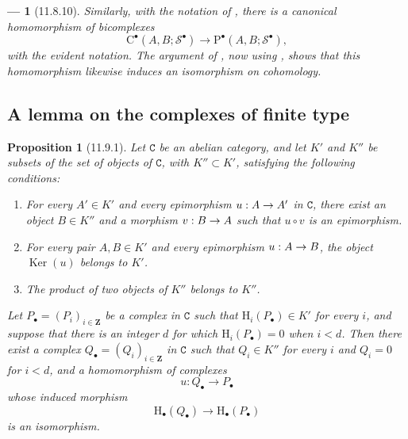 \documentclass[oneside]{amsart}
\theoremstyle{ega-env-style}
\newtheorem*{env}{---}
\theoremstyle{ega-thm-env-style}
\newtheorem*{proposition}{Proposition}
\theoremstyle{ega-defn-env-style}
\def\mathcal{\mathscr}
\def\sh{\mathcal}                   %
\def\bb{\mathbf}                    %
\def\cat{\mathtt}                   %
\def\HH{\mathrm{H}}                 %
\def\Ker{\operatorname{Ker}}
\renewcommand{\to}{\mathchoice{\longrightarrow}{\rightarrow}{\rightarrow}{\rightarrow}}
\let\EGAOriginalLabel\label
\renewcommand{\label}[1]{\phantomsection\EGAOriginalLabel{#1}}
\begin{document}
\begin{env}[11.8.10]
\label{0.11.8.10}
Similarly, with the notation of , there is a canonical
homomorphism of bicomplexes
\[
  \mathrm{C}^\bullet(A,B;\sh{S}^\bullet)
  \longrightarrow
  \mathrm{P}^\bullet(A,B;\sh{S}^\bullet),
\]
with the evident notation.
The argument of , now using , shows that
this homomorphism likewise induces an isomorphism on cohomology.
\end{env}

\subsection{A lemma on the complexes of finite type}
\label{subsection:0.11.9}

\begin{proposition}[11.9.1]
\label{0.11.9.1}
Let $\cat{C}$ be an abelian category, and let $K'$ and $K''$ be subsets
of the set of objects of $\cat{C}$, with $K''\subset K'$, satisfying the
following conditions:
\begin{enumerate}
  \item[{\rm(i)}]
  \emph{For every $A'\in K'$ and every epimorphism $u:A\to A'$ in
  $\cat{C}$, there exist an object $B\in K''$ and a morphism $v:B\to A$
  such that $u\circ v$ is an epimorphism.}

  \item[{\rm(ii)}]
  \emph{For every pair $A,B\in K'$ and every epimorphism $u:A\to B$,
  the object $\Ker(u)$ belongs to $K'$.}

  \item[{\rm(iii)}]
  \emph{The product of two objects of $K''$ belongs to $K''$.}
\end{enumerate}

\emph{Let $P_\bullet=(P_i)_{i\in\bb{Z}}$ be a complex in $\cat{C}$ such
that $\HH_i(P_\bullet)\in K'$ for every $i$, and suppose that there is an
integer $d$ for which $\HH_i(P_\bullet)=0$ when $i<d$.
Then there exist a complex $Q_\bullet=(Q_i)_{i\in\bb{Z}}$ in $\cat{C}$
such that $Q_i\in K''$ for every $i$ and $Q_i=0$ for $i<d$, and a
homomorphism of complexes
\[
  u:Q_\bullet\longrightarrow P_\bullet
\]
whose induced morphism
\[
  \HH_\bullet(Q_\bullet)\longrightarrow\HH_\bullet(P_\bullet)
\]
is an isomorphism.}
\end{proposition}
\end{document}
